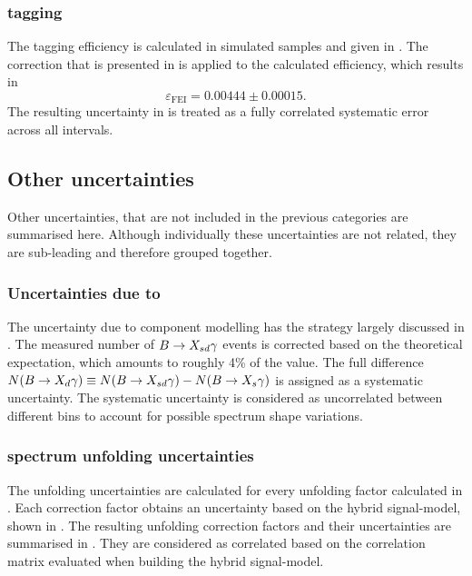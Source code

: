 \subsubsection{\texorpdfstring{\BtoXsgamma}{B->Xs gamma} tagging}

The tagging efficiency is calculated in simulated samples and given in .
The correction that is presented in  is applied to the calculated efficiency, which results in
\begin{equation}\label{eq:tag_efficiency_with_uncertainty}
    \varepsilon_{\mathrm{FEI}} = 0.00444\pm0.00015.
\end{equation}
The resulting uncertainty in  is treated as a fully correlated systematic error across all \EB intervals.

\subsection{Other uncertainties}\label{sec:other_uncertainties}

Other uncertainties, that are not included in the previous categories are summarised here.
Although individually these uncertainties are not related, they are sub-leading and therefore grouped together.

\subsubsection{Uncertainties due to \texorpdfstring{\BtoXdgamma}{B->Xd gamma}}\label{sec:xdgamma_systematic}

The uncertainty due to \BtoXdgamma component modelling has the strategy largely discussed in .
The measured number of $\BtoXsdgamma$ events is corrected based on the theoretical \BtoXdgamma expectation, which amounts to roughly 4\% of the value.
The full difference $N(\BtoXdgamma) \equiv N(\BtoXsdgamma)-N(\BtoXsgamma)$ is assigned as a systematic uncertainty.
The systematic uncertainty is considered as uncorrelated between different \EB bins to account for possible spectrum shape variations.

\subsubsection{\texorpdfstring{\EB}{EB} spectrum unfolding uncertainties}\label{sec:unfolding_systematic}

The unfolding uncertainties are calculated for every unfolding factor calculated in .
Each correction factor obtains an uncertainty based on the hybrid signal-model, shown in .
The resulting unfolding correction factors and their uncertainties are summarised in .
They are considered as correlated based on the correlation matrix evaluated when building the hybrid signal-model.

